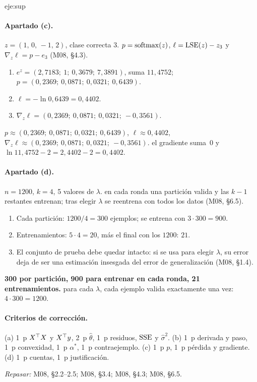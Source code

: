 \begin{solucion}{eje:sup}
\paragraph{Apartado (c).}
\datos $z=(1,\,0,\,-1,\,2)$, clase correcta $3$.
\planteamiento $p=\operatorname{softmax}(z)$, $\ell=\operatorname{LSE}(z)-z_3$ y $\nabla_z\ell=p-e_3$ (M08, §4.3).
\pasos
\begin{enumerate}[label=\arabic*.]
  \item $e^{z}=(2{,}7183;\allowbreak\ 1;\allowbreak\ 0{,}3679;\allowbreak\ 7{,}3891)$, suma $11{,}4752$; $p=(0{,}2369;\allowbreak\ 0{,}0871;\allowbreak\ 0{,}0321;\allowbreak\ 0{,}6439)$.
  \item $\ell=-\ln 0{,}6439=0{,}4402$.
  \item $\nabla_z\ell=(0{,}2369;\allowbreak\ 0{,}0871;\allowbreak\ 0{,}0321;\allowbreak\ -0{,}3561)$.
\end{enumerate}
\resultado $p\approx(0{,}2369;\allowbreak\ 0{,}0871;\allowbreak\ 0{,}0321;\allowbreak\ 0{,}6439)$, $\ell\approx 0{,}4402$, $\nabla_z\ell\approx(0{,}2369;\allowbreak\ 0{,}0871;\allowbreak\ 0{,}0321;\allowbreak\ -0{,}3561)$.
\comprobacion el gradiente suma~0 y $\ln 11{,}4752-2=2{,}4402-2=0{,}4402$.

\paragraph{Apartado (d).}
\datos $n=1200$, $k=4$, 5 valores de $\lambda$.
\planteamiento en cada ronda una partición valida y las $k-1$ restantes entrenan; tras elegir $\lambda$ se reentrena con todos los datos (M08, §6.5).
\pasos
\begin{enumerate}[label=\arabic*.]
  \item Cada partición: $1200/4=300$ ejemplos; se entrena con $3\cdot 300=900$.
  \item Entrenamientos: $5\cdot 4=20$, más el final con los $1200$: $21$.
  \item El conjunto de prueba debe quedar intacto: si se usa para elegir $\lambda$, su error deja de ser una estimación insesgada del error de generalización (M08, §1.4).
\end{enumerate}
\resultado \textbf{300 por partición, 900 para entrenar en cada ronda, 21 entrenamientos.}
\comprobacion para cada $\lambda$, cada ejemplo valida exactamente una vez: $4\cdot 300=1200$.

\paragraph{Criterios de corrección.} (a) 1~p $X^{\top} X$ y $X^{\top} y$, 2~p $\hat\theta$, 1~p residuos, $\operatorname{SSE}$ y $\hat\sigma^{2}$. (b) 1~p derivada y paso, 1~p convexidad, 1~p $\alpha^{*}$, 1~p contraejemplo. (c) 1~p $p$, 1~p pérdida y gradiente. (d) 1~p cuentas, 1~p justificación.

\textit{Repasar:} M08, §2.2--2.5; M08, §3.4; M08, §4.3; M08, §6.5.
\end{solucion}

